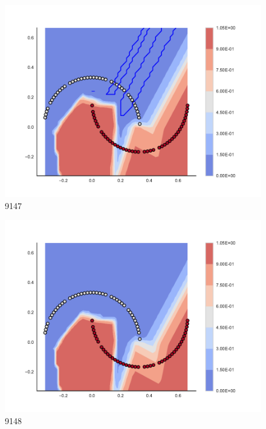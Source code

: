 \begin{subfigure}[b]{0.09\textwidth}
    \includegraphics[clip, trim=2.35cm 1.75cm 4.5cm 0cm,width=\textwidth]{img/convergence/9147.pdf}
    \caption{9147}
    \label{fig:convergence_9147}
\end{subfigure}
%
\begin{subfigure}[b]{0.09\textwidth}
    \includegraphics[clip, trim=2.35cm 1.75cm 4.5cm 0cm,width=\textwidth]{img/convergence/9148.pdf}
    \caption{9148}
    \label{fig:convergence_9148}
\end{subfigure}
%
